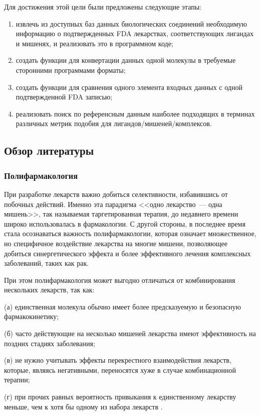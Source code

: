 \documentclass[a4paper,14pt]{article}         %
\begin{document}
Для достижения этой цели были предложены следующие этапы:
\begin{enumerate}
	\item извлечь из доступных баз данных биологических соединений необходимую информацию о подтвержденных FDA лекарствах, соответствующих лигандах и мишенях, и реализовать это в программном коде;
	\item создать функции для конвертации данных одной молекулы в требуемые сторонними программами форматы;
	\item создать функции для сравнения одного элемента входных данных с одной подтвержденной FDA записью;
	\item реализовать поиск по референсным данным наиболее подходящих в терминах различных метрик подобия для лигандов/мишеней/комплексов.
\end{enumerate}

\subsection{Обзор литературы}
\subsubsection{Полифармакология}
При разработке лекарств важно добиться селективности, избавившись от побочных действий. Именно эта парадигма <<одно лекарство~--- одна мишень>>, так называемая таргетированная терапия, до недавнего времени широко использовалась в фармакологии. С другой стороны, в последнее время стала осознаваться важность полифармакологии, которая означает множественное, но специфичное воздействие лекарства на многие мишени, позволяющее добиться синергетического эффекта и более эффективного лечения комплексных заболеваний, таких как рак\cite{Anighoro2014}. 

При этом полифармакология может выгодно отличаться от комбинирования нескольких лекарств, так как:

(а) единственная молекула обычно имеет более предсказуемую и безо\-пасную фармакокинетику; 

(б) часто действующие на несколько мишеней лекарства имеют  эффективность на поздних стадиях заболевания; 

(в) не нужно учитывать эффекты перекрестного взаимодействия лекарств, которые, являясь негативными, переносятся хуже в случае комбинационной терапии; 

(г) при прочих равных  вероятность привыкания к единственному лекарству меньше, чем к хотя бы одному из набора лекарств \cite{Anighoro2014}.
\end{document}
